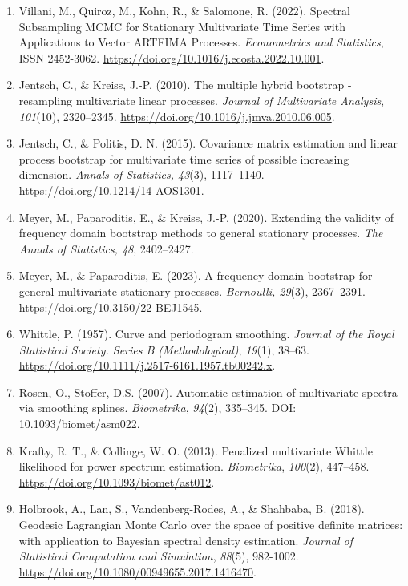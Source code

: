 \documentclass[12pt,a4paper]{article}
\begin{document}
\begin{enumerate}
\item \label{Villani (2022)} Villani, M., Quiroz, M., Kohn, R., \& Salomone, R. (2022). Spectral Subsampling MCMC for Stationary Multivariate Time Series with Applications to Vector ARTFIMA Processes. \emph{Econometrics and Statistics}, ISSN 2452-3062. \url{https://doi.org/10.1016/j.ecosta.2022.10.001}.

\item \label{Jentsch2010} Jentsch, C., \& Kreiss, J.-P. (2010). The multiple hybrid bootstrap - resampling multivariate linear processes. \emph{Journal of Multivariate Analysis}, \emph{101}(10), 2320–2345. \url{https://doi.org/10.1016/j.jmva.2010.06.005}.

\item \label{Jentsch2015} Jentsch, C., \& Politis, D. N. (2015). Covariance matrix estimation and linear process bootstrap for multivariate time series of possible increasing dimension. \emph{Annals of Statistics, 43}(3), 1117–1140. \url{https://doi.org/10.1214/14-AOS1301}.

\item \label{Meyer2020} Meyer, M., Paparoditis, E., \& Kreiss, J.-P. (2020). Extending the validity of frequency domain bootstrap methods to general stationary processes. \emph{The Annals of Statistics, 48}, 2402–2427.

\item \label{meyer2023} Meyer, M., \& Paparoditis, E. (2023). A frequency domain bootstrap for general multivariate stationary processes. \emph{Bernoulli, 29}(3), 2367–2391. \url{https://doi.org/10.3150/22-BEJ1545}.

\item \label{whittle} Whittle, P. (1957). Curve and periodogram smoothing. \emph{Journal of the Royal Statistical Society. Series B (Methodological)}, \emph{19}(1), 38–63. \url{https://doi.org/10.1111/j.2517-6161.1957.tb00242.x}.

\item \label{rosen-stoffer-2007} Rosen, O., Stoffer, D.S. (2007). Automatic estimation of multivariate spectra via smoothing splines. \emph{Biometrika}, \textit{94}(2), 335–345. DOI: 10.1093/biomet/asm022.

\item \label{Krafty 2013} Krafty, R. T., \& Collinge, W. O. (2013). Penalized multivariate Whittle likelihood for power spectrum estimation. \emph{Biometrika}, \textit{100}(2), 447–458. \url{https://doi.org/10.1093/biomet/ast012}.

\item \label{Holbrook 2018} Holbrook, A., Lan, S., Vandenberg-Rodes, A., \& Shahbaba, B. (2018). Geodesic Lagrangian Monte Carlo over the space of positive definite matrices: with application to Bayesian spectral density estimation. \emph{Journal of Statistical Computation and Simulation}, \textit{88}(5), 982-1002. \url{https://doi.org/10.1080/00949655.2017.1416470}.


\end{enumerate}
\end{document}
